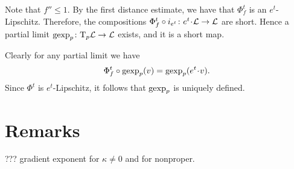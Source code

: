 Note that $f''\le 1$.
By the first distance estimate, we have that $\Phi^t_{f}$ is an $e^t$-Lipschitz.
Therefore, the compositions $\Phi^t_{f}\circ i_{e^t}\:e^t{\cdot} \spc{L}\to \spc{L}$ are short. 
Hence a partial limit $\operatorname{\rm gexp}\nolimits_p\colon\mathrm{T}_p
\mathcal{L}\to \mathcal{L}$ exists, and it is a short map.

Clearly for any partial limit we have
\[\Phi^t_f\circ\gexp_p(v)=\gexp_p(e^t\cdot v).\]
Since $\Phi^t$ is $e^t$-Lipschitz, it follows that $\operatorname{\rm gexp}\nolimits_p$ is uniquely
defined.
\qeds

\section{Remarks}

??? gradient exponent for $\kappa\ne 0$
and for nonproper.
